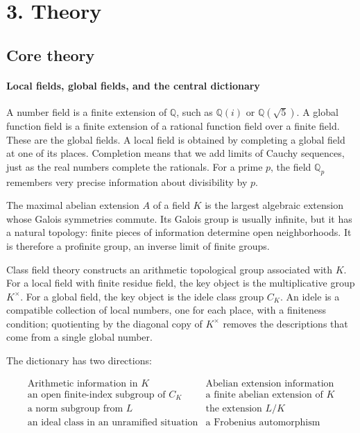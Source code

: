 \section*{3. Theory}
\subsection*{Core theory}
\paragraph{Local fields, global fields, and the central dictionary}

A number field is a finite extension of $\mathbb Q$, such as $\mathbb Q(i)$ or $\mathbb Q(\sqrt5)$. A global function field is a finite extension of a rational function field over a finite field. These are the global fields. A local field is obtained by completing a global field at one of its places. Completion means that we add limits of Cauchy sequences, just as the real numbers complete the rationals. For a prime $p$, the field $\mathbb Q_p$ remembers very precise information about divisibility by $p$.

The maximal abelian extension $A$ of a field $K$ is the largest algebraic extension whose Galois symmetries commute. Its Galois group is usually infinite, but it has a natural topology: finite pieces of information determine open neighborhoods. It is therefore a profinite group, an inverse limit of finite groups.

Class field theory constructs an arithmetic topological group associated with $K$. For a local field with finite residue field, the key object is the multiplicative group $K^\times$. For a global field, the key object is the idele class group $C_K$. An idele is a compatible collection of local numbers, one for each place, with a finiteness condition; quotienting by the diagonal copy of $K^\times$ removes the descriptions that come from a single global number. \cite{class_field_theory_ref1,class_field_theory_ref5}

The dictionary has two directions:

{\small
\[
\begin{array}{c|c}
\text{Arithmetic information in }K & \text{Abelian extension information}\\
\hline
\text{an open finite-index subgroup of }C_K & \text{a finite abelian extension of }K\\
\text{a norm subgroup from }L & \text{the extension }L/K\\
\text{an ideal class in an unramified situation} & \text{a Frobenius automorphism}
\end{array}
\]
}

